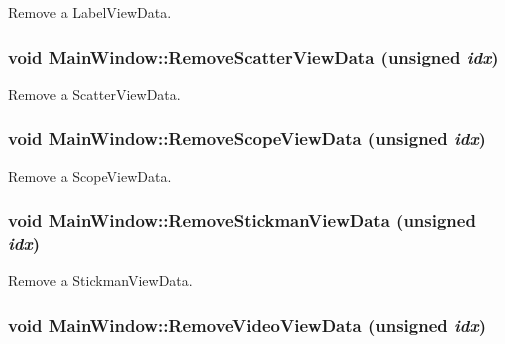Remove a LabelViewData. 

\hypertarget{class_main_window_11d2190e49435ba3bcede3603cd2f4f2}{
\subsubsection[{RemoveScatterViewData}]{\setlength{\rightskip}{0pt plus 5cm}void MainWindow::RemoveScatterViewData (unsigned {\em idx})}}
\label{class_main_window_11d2190e49435ba3bcede3603cd2f4f2}


Remove a ScatterViewData. 

\hypertarget{class_main_window_8568ff0e98fd287a2e5b92fd63072e7a}{
\subsubsection[{RemoveScopeViewData}]{\setlength{\rightskip}{0pt plus 5cm}void MainWindow::RemoveScopeViewData (unsigned {\em idx})}}
\label{class_main_window_8568ff0e98fd287a2e5b92fd63072e7a}


Remove a ScopeViewData. 

\hypertarget{class_main_window_97e67eccc3b0e234cc28061df132bfba}{
\subsubsection[{RemoveStickmanViewData}]{\setlength{\rightskip}{0pt plus 5cm}void MainWindow::RemoveStickmanViewData (unsigned {\em idx})}}
\label{class_main_window_97e67eccc3b0e234cc28061df132bfba}


Remove a StickmanViewData. 

\hypertarget{class_main_window_6d77b7c5a964ca90883f8fa04ebe41ca}{
\subsubsection[{RemoveVideoViewData}]{\setlength{\rightskip}{0pt plus 5cm}void MainWindow::RemoveVideoViewData (unsigned {\em idx})}}
\label{class_main_window_6d77b7c5a964ca90883f8fa04ebe41ca}



